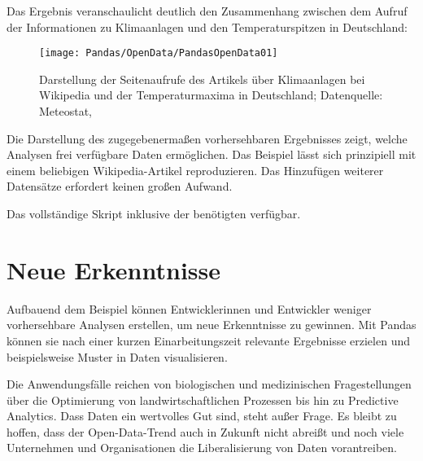 



\PYTHON{}





\PYTHON{}



\medskip


Das Ergebnis veranschaulicht deutlich den Zusammenhang zwischen dem Aufruf der Informationen zu Klimaanlagen und den Temperaturspitzen in Deutschland:

\begin{figure}
	\texttt{[image: Pandas/OpenData/PandasOpenData01]}
	\caption{Darstellung der Seitenaufrufe des Artikels über Klimaanlagen bei Wikipedia und der Temperaturmaxima in Deutschland; Datenquelle: Meteostat, }
\end{figure}



Die Darstellung des zugegebenermaßen vorhersehbaren Ergebnisses zeigt, welche Analysen frei verfügbare Daten ermöglichen. Das Beispiel lässt sich prinzipiell mit einem beliebigen Wikipedia-Artikel reproduzieren. Das Hinzufügen weiterer Datensätze erfordert keinen großen Aufwand.

Das vollständige Skript inklusive der benötigten  verfügbar.

\section{Neue Erkenntnisse}
	
Aufbauend dem Beispiel können Entwicklerinnen und Entwickler weniger vorhersehbare Analysen erstellen, um neue Erkenntnisse zu gewinnen. Mit Pandas können sie nach einer kurzen Einarbeitungszeit relevante Ergebnisse erzielen und beispielsweise Muster in Daten visualisieren.
	
Die Anwendungsfälle reichen von biologischen und medizinischen Fragestellungen über die Optimierung von landwirtschaftlichen Prozessen bis hin zu Predictive Analytics. Dass Daten ein wertvolles Gut sind, steht außer Frage. Es bleibt zu hoffen, dass der Open-Data-Trend auch in Zukunft nicht abreißt und noch viele Unternehmen und Organisationen die Liberalisierung von Daten vorantreiben.
	
